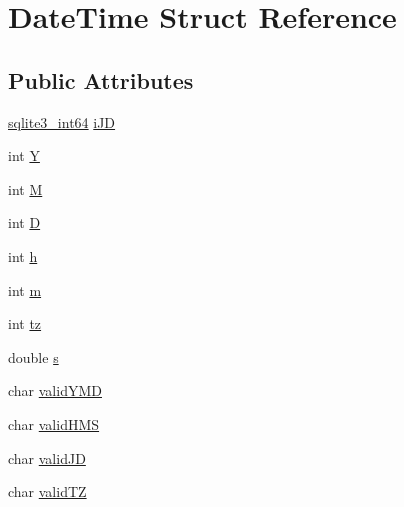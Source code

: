 \hypertarget{struct_date_time}{\section{Date\-Time Struct Reference}
\label{struct_date_time}
}
\subsection*{Public Attributes}
\begin{DoxyCompactItemize}
\item 
\hyperlink{sqlite3_8c_a0a4d3e6c1ad46f90e746b920ab6ca0d2}{sqlite3\-\_\-int64} \hyperlink{struct_date_time_ae5043d34fa3c3c4dc1121fec886c6f10}{i\-J\-D}
\item 
int \hyperlink{struct_date_time_ad39449618b2a15128e32766a208753cf}{Y}
\item 
int \hyperlink{struct_date_time_a00e6515603bb5d7c5ce79d3a5a6438a7}{M}
\item 
int \hyperlink{struct_date_time_a979ec52428a05d2f2ed827345a416fa6}{D}
\item 
int \hyperlink{struct_date_time_a2146547149b65f64e07e1ac6ed8654b6}{h}
\item 
int \hyperlink{struct_date_time_ac5db527c48331a515bea3b828d1a2254}{m}
\item 
int \hyperlink{struct_date_time_a7f5c2e587ee18014982d85eb616f09b8}{tz}
\item 
double \hyperlink{struct_date_time_a69a803afb69b74206418bda0bc1bcaa2}{s}
\item 
char \hyperlink{struct_date_time_aaa042bec0879cd922039062433f4b26f}{valid\-Y\-M\-D}
\item 
char \hyperlink{struct_date_time_aba26b32c6142cf6bfc09db3088b90add}{valid\-H\-M\-S}
\item 
char \hyperlink{struct_date_time_a1962742892150a03dc5d302f43efbb04}{valid\-J\-D}
\item 
char \hyperlink{struct_date_time_af3dfda2bdbb2183dc1b94f449701b81e}{valid\-T\-Z}
\end{DoxyCompactItemize}


